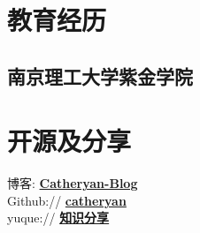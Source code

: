 \documentclass[]{deedy-resume-openfont}
\begin{document}
%
%
\lastupdated

%
%

%
%

\begin{minipage}[t]{0.25\textwidth} 


\section{教育经历} 
\sectionsep

\subsection{南京理工大学紫金学院}
\sectionsep




\section{开源及分享}
\sectionsep
博客:  \href{https://catheryan.github.io/}{\bf Catheryan-Blog} \\   
Github:// \href{https://github.com/Catheryan/}{\bf catheryan} \\
yuque://  \href{https://www.yuque.com/g/juejiangdexiaohao/fflqe5/collaborator/join?token=98fARMSD1wPewTat&source=book_collaborator# 《项目整理》}{\bf 知识分享} \\




\end{minipage}
\end{document}
